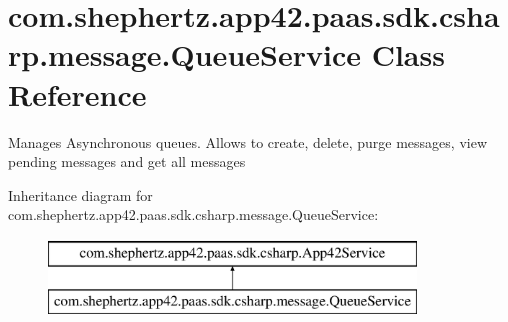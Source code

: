 \hypertarget{classcom_1_1shephertz_1_1app42_1_1paas_1_1sdk_1_1csharp_1_1message_1_1_queue_service}{\section{com.\+shephertz.\+app42.\+paas.\+sdk.\+csharp.\+message.\+Queue\+Service Class Reference}
\label{classcom_1_1shephertz_1_1app42_1_1paas_1_1sdk_1_1csharp_1_1message_1_1_queue_service}
}


Manages Asynchronous queues. Allows to create, delete, purge messages, view pending messages and get all messages  


Inheritance diagram for com.\+shephertz.\+app42.\+paas.\+sdk.\+csharp.\+message.\+Queue\+Service\+:\begin{figure}[H]
\begin{center}
\leavevmode
\includegraphics[height=2.000000cm]{classcom_1_1shephertz_1_1app42_1_1paas_1_1sdk_1_1csharp_1_1message_1_1_queue_service}
\end{center}
\end{figure}
